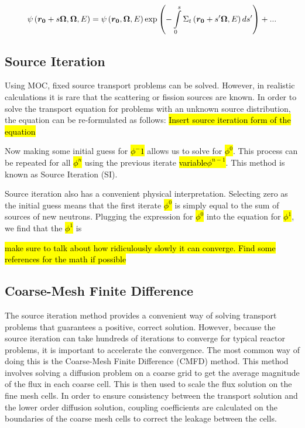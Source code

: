 {\begin{gather}\label{e:MOCflatsource}
\psi\left(\bm {r_0} + s\bm\Omega,\bm\Omega,E\right) = \psi\left(\bm {r_0},\bm\Omega,E\right)\exp{\left(-\intop_0^s \Sigma_t\left(\bm {r_0} + s'\bm\Omega,E\right)ds'\right)} + ...
\end{gather}

\subsection{Source Iteration}

Using MOC, fixed source transport problems can be solved.  However, in realistic calculations it is rare that the scattering or fission sources are known.  In order to solve the transport equation for problems with an unknown source distribution, the equation can be re-formulated as follows:
\hl{Insert source iteration form of the equation}

Now making some initial guess for \hl{$\phi^-1$} allows us to solve for \hl{$\phi^0$}.  This process can be repeated for all \hl{$\phi^n$} using the previous iterate \hl{variable$\phi^{n-1}$}.  This method is known as Source Iteration (SI).

Source iteration also has a convenient physical interpretation.  Selecting zero as the initial guess means that the first iterate \hl{$\phi^0$} is simply equal to the sum of sources of new neutrons.  Plugging the expression for \hl{$\phi^0$} into the equation for \hl{$\phi^1$}, we find that the \hl{$\phi^1$} is 

\hl{make sure to talk about how ridiculously slowly it can converge.  Find some references for the math if possible}}{}

\subsection{Coarse-Mesh Finite Difference}\label{ss:CMFD}

The source iteration method provides a convenient way of solving transport problems that guarantees a positive, correct solution.  However, because the source iteration can take hundreds of iterations to converge for typical reactor problems, it is important to accelerate the convergence.  The most common way of doing this is the Coarse-Mesh Finite Difference (CMFD) method.  This method involves solving a diffusion problem on a coarse grid to get the average magnitude of the flux in each coarse cell.  This is then used to scale the flux solution on the fine mesh cells.  In order to ensure consistency between the transport solution and the lower order diffusion solution, coupling coefficients are calculated on the boundaries of the coarse mesh cells to correct the leakage between the cells.

